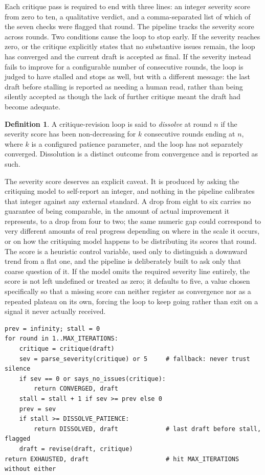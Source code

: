 \documentclass[11pt]{article}
\theoremstyle{definition}
\newtheorem{definition}{Definition}
\begin{document}
Each critique pass is required to end with three lines: an integer
severity score from zero to ten, a qualitative verdict, and a
comma-separated list of which of the seven checks were flagged that
round. The pipeline tracks the severity score across rounds. Two
conditions cause the loop to stop early. If the severity reaches zero,
or the critique explicitly states that no substantive issues remain,
the loop has converged and the current draft is accepted as final. If
the severity instead fails to improve for a configurable number of
consecutive rounds, the loop is judged to have stalled and stops as
well, but with a different message: the last draft before stalling is
reported as needing a human read, rather than being silently accepted
as though the lack of further critique meant the draft had become
adequate.

\begin{definition}
A critique-revision loop is said to \emph{dissolve} at round $n$ if the
severity score has been non-decreasing for $k$ consecutive rounds ending
at $n$, where $k$ is a configured patience parameter, and the loop has
not separately converged. Dissolution is a distinct outcome from
convergence and is reported as such.
\end{definition}

The severity score deserves an explicit caveat. It is produced by
asking the critiquing model to self-report an integer, and nothing in
the pipeline calibrates that integer against any external standard. A
drop from eight to six carries no guarantee of being comparable, in the
amount of actual improvement it represents, to a drop from four to two;
the same numeric gap could correspond to very different amounts of real
progress depending on where in the scale it occurs, or on how the
critiquing model happens to be distributing its scores that round. The
score is a heuristic control variable, used only to distinguish a
downward trend from a flat one, and the pipeline is deliberately built
to ask only that coarse question of it. If the model omits the required
severity line entirely, the score is not left undefined or treated as
zero; it defaults to five, a value chosen specifically so that a
missing score can neither register as convergence nor as a repeated
plateau on its own, forcing the loop to keep going rather than exit on
a signal it never actually received.

\begin{lstlisting}[caption={The persistence loop as a state machine}]
prev = infinity; stall = 0
for round in 1..MAX_ITERATIONS:
    critique = critique(draft)
    sev = parse_severity(critique) or 5     # fallback: never trust silence
    if sev == 0 or says_no_issues(critique):
        return CONVERGED, draft
    stall = stall + 1 if sev >= prev else 0
    prev = sev
    if stall >= DISSOLVE_PATIENCE:
        return DISSOLVED, draft             # last draft before stall, flagged
    draft = revise(draft, critique)
return EXHAUSTED, draft                     # hit MAX_ITERATIONS without either
\end{lstlisting}
\end{document}
